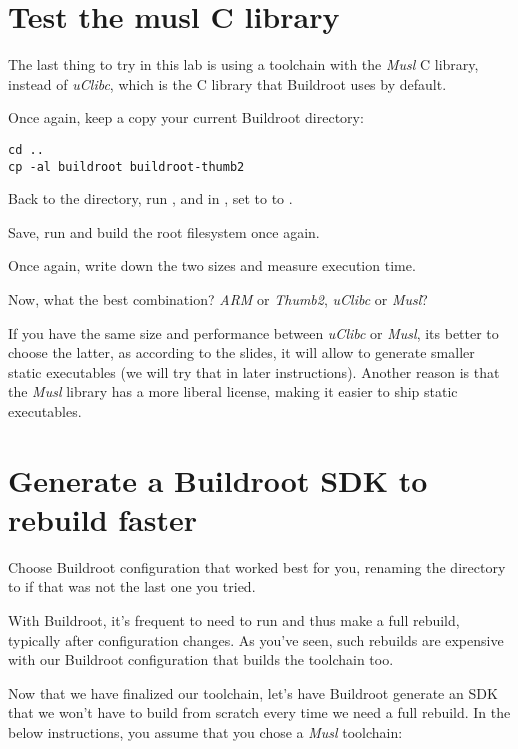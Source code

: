\section{Test the musl C library}

The last thing to try in this lab is using a toolchain with the {\em
Musl} C library, instead of {\em uClibc}, which is the C library that
Buildroot uses by default.

Once again, keep a copy your current Buildroot directory:
\begin{verbatim}
cd ..
cp -al buildroot buildroot-thumb2
\end{verbatim}

Back to the  directory, run , and
in , set  to to .

Save, run  and build the root filesystem once again.

Once again, write down the two sizes and measure  execution
time.

Now, what the best combination? {\em ARM} or {\em Thumb2},
{\em uClibc} or {\em Musl}?

If you have the same size and performance between {\em uClibc} or {\em
Musl}, its better to choose the latter, as according to the slides, it
will allow to generate smaller static executables (we will try that
in later instructions). Another reason is that the {\em Musl} library
has a more liberal license, making it easier to ship static executables.

\section{Generate a Buildroot SDK to rebuild faster}

Choose Buildroot configuration that worked best for you, renaming
the directory to  if that was not the last one you
tried.

With Buildroot, it's frequent to need to run  and
thus make a full rebuild, typically after configuration changes.
As you've seen, such rebuilds are expensive with our Buildroot
configuration that builds the toolchain too.

Now that we have finalized our toolchain, let's have Buildroot generate
an SDK that we won't have to build from scratch every time we need a
full rebuild. In the below instructions, you assume that you chose a
{\em Musl} toolchain:

